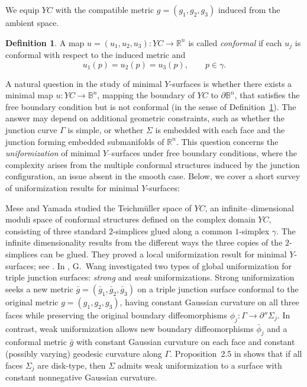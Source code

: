 \documentclass[11pt]{amsart}
\numberwithin{equation}{section}
\theoremstyle{theorem}
\theoremstyle{definition}
\newtheorem{definition}[theorem]{Definition}
\numberwithin{equation}{section}
\begin{document}
We equip $YC$ with the compatible metric $g=(g_1,g_2,g_3)$ induced from the ambient space. 

\begin{definition}\label{def:conformal}
A map $u=(u_1,u_2,u_3):YC\to\mathbb{R}^n$ is called \emph{conformal} if each $u_j$ is conformal with respect to the induced metric and
\[
u_1(p)=u_2(p)=u_3(p), \qquad p\in\gamma .
\]
\end{definition}

A natural question in the study of minimal $Y$-surfaces is whether there exists a minimal map $u :YC \rightarrow \mathbb{B}^n$, mapping the boundary of $YC$ to $\partial \mathbb{B}^n$, that satisfies the free boundary condition but is not conformal (in the sense of Definition~\ref{def:conformal}). 
The answer may depend on additional geometric constraints, such as whether the junction curve $\Gamma$ is simple, or whether $\Sigma$ is embedded with each face and the junction forming embedded submanifolds of $\mathbb{R}^n$. 
This question concerns the \emph{uniformization} of minimal $Y$–surfaces under free boundary conditions, where the complexity arises from the multiple conformal structures induced by the junction configuration, an issue absent in the smooth case. Below, we cover a short survey of uniformization results for minimal $Y$-surfaces:
\medskip


Mese and Yamada \cite{mese2006parameterized, mese2011local} studied the Teichmüller space of $YC$, an infinite–dimensional moduli space of conformal structures defined on the complex domain $YC$, consisting of three standard $2$-simplices glued along a common $1$-simplex $\gamma$. 
The infinite dimensionality results from the different ways the three copies of the $2$-simplices can be glued. 
They proved a local uniformization result for minimal $Y$-surfaces; see \cite[Theorem~6]{mese2011local}. 
In \cite{wang2021uniformization}, G.~Wang investigated two types of global uniformization for triple junction surfaces: \emph{strong} and \emph{weak} uniformizations. 
Strong uniformization seeks a new metric $\bar{g}=(\bar{g}_1, \bar{g}_2, \bar{g}_3)$ on a triple junction surface conformal to the original metric $g=(g_1,g_2,g_3)$, having constant Gaussian curvature on all three faces while preserving the original boundary diffeomorphisms $\phi_j : \Gamma \rightarrow \partial'' \Sigma_j$. 
In contrast, weak uniformization allows new boundary diffeomorphisms $\bar{\phi}_j$ and a conformal metric $\bar{g}$ with constant Gaussian curvature on each face and constant (possibly varying) geodesic curvature along $\Gamma$. 
Proposition~2.5 in \cite{wang2021uniformization} shows that if all faces $\Sigma_j$ are disk-type, then $\Sigma$ admits weak uniformization to a surface with constant nonnegative Gaussian curvature.
\medskip
\end{document}
